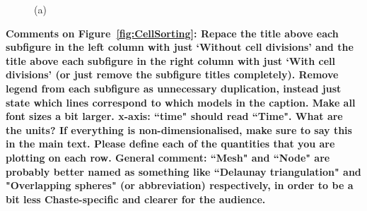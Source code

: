 \documentclass{article}
\newcommand{\highlight}[1]{{\color{red} \bf{#1}}}
\begin{document}
\begin{figure}
{\label{fig:CellSortingMetrics:e}
}
\caption{(a)}
\label{fig:CellSortingMetrics}
\end{figure}

\highlight{Comments on Figure~\ref{fig:CellSorting}: 
Repace the title above each subfigure in the left column with just `Without cell divisions' and the title above each subfigure in the right column with just `With cell divisions' (or just remove the subfigure titles completely).
Remove legend from each subfigure as unnecessary duplication, instead just state which lines correspond to which models in the caption. 
Make all font sizes a bit larger. 
x-axis: ``time" should read ``Time". 
What are the units? If everything is non-dimensionalised, make sure to say this in the main text. 
Please define each of the quantities that you are plotting on each row. 
General comment: ``Mesh" and ``Node" are probably better named as something like ``Delaunay triangulation" and "Overlapping spheres" (or abbreviation) respectively, in order to be a bit less Chaste-specific and clearer for the audience.}
\end{document}
